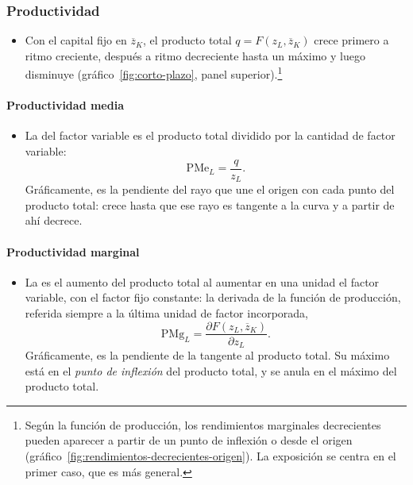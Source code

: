 \documentclass[11pt]{article}
\begin{document}
\subsubsection{Productividad}\label{sec:productividad}

\begin{itemize}
\item Con el capital fijo en $\overline{z}_K$, el producto total $q=F(z_L,\overline{z}_K)$ crece primero a ritmo creciente, después a ritmo decreciente hasta un máximo y luego disminuye (gráfico~\ref{fig:corto-plazo}, panel superior).\footnote{Según la función de producción, los rendimientos marginales decrecientes pueden aparecer a partir de un punto de inflexión o desde el origen (gráfico~\ref{fig:rendimientos-decrecientes-origen}). La exposición se centra en el primer caso, que es más general.}
\end{itemize}

\paragraph{Productividad media}

\begin{itemize}
\item La  del factor variable es el producto total dividido por la cantidad de factor variable:
  \begin{equation}
  \mathrm{PMe}_L=\frac{q}{z_L}. \label{eq:pme}
  \end{equation}
  Gráficamente, es la pendiente del rayo que une el origen con cada punto del producto total: crece hasta que ese rayo es tangente a la curva y a partir de ahí decrece.
\end{itemize}

\paragraph{Productividad marginal}

\begin{itemize}
\item La  es el aumento del producto total al aumentar en una unidad el factor variable, con el factor fijo constante: la derivada de la función de producción, referida siempre a la última unidad de factor incorporada,
  \begin{equation}
  \mathrm{PMg}_L=\frac{\partial F(z_L,\overline{z}_K)}{\partial z_L}. \label{eq:pmg}
  \end{equation}
  Gráficamente, es la pendiente de la tangente al producto total. Su máximo está en el \emph{punto de inflexión} del producto total, y se anula en el máximo del producto total.
\end{itemize}
\end{document}
